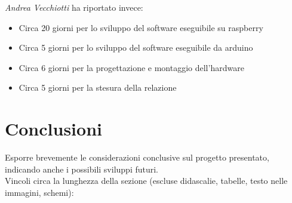 \documentclass[12pt]{article}
\begin{document}
\textit{Andrea Vecchiotti} ha riportato invece:
\begin{itemize}
\item Circa 20 giorni  per lo sviluppo del software eseguibile su raspberry
\item Circa 5 giorni per lo sviluppo del software eseguibile da arduino
\item Circa 6 giorni per la progettazione e montaggio dell'hardware
\item Circa 5 giorni per la stesura della relazione
\end{itemize}
\newpage


\section{Conclusioni}

Esporre brevemente le considerazioni conclusive sul progetto presentato, indicando anche i possibili sviluppi futuri.\\

Vincoli circa la lunghezza della sezione (escluse didascalie, tabelle, testo nelle immagini, schemi):
\end{document}
